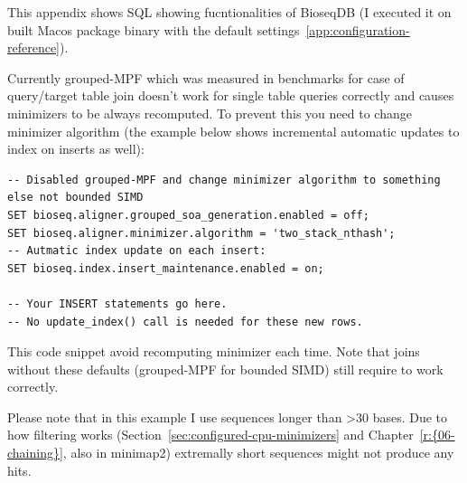 \label{app:sql-walkthrough}

This appendix shows SQL showing fucntionalities of BioseqDB (I executed it on built Macos package binary with the default settings~\ref{app:configuration-reference}).


Currently grouped-MPF which was measured in benchmarks for case of query/target table join doesn't work for single table queries correctly and causes minimizers to be always recomputed.
To prevent this you need to change minimizer algorithm (the example below shows incremental automatic updates to index on inserts as well):

\noindent\begin{minipage}{\linewidth}
\begin{lstlisting}[style=bioseq-search-sql,caption={How to avoid index-read bug (always recompute minimizers)},label={lst:sql-index-read-bug-recompute}]
-- Disabled grouped-MPF and change minimizer algorithm to something else not bounded SIMD
SET bioseq.aligner.grouped_soa_generation.enabled = off;
SET bioseq.aligner.minimizer.algorithm = 'two_stack_nthash';
-- Autmatic index update on each insert:
SET bioseq.index.insert_maintenance.enabled = on;

-- Your INSERT statements go here.
-- No update_index() call is needed for these new rows.
\end{lstlisting}
\end{minipage}

This code snippet avoid recomputing minimizer each time. Note that joins without these defaults (grouped-MPF for bounded SIMD) still require  to work correctly.


Please note that in this example I use sequences longer than >30 bases. Due to how filtering works (Section~\ref{sec:configured-cpu-minimizers} and Chapter~\ref{r:{06-chaining}}, also in minimap2) extremally short sequences might not produce any hits.
